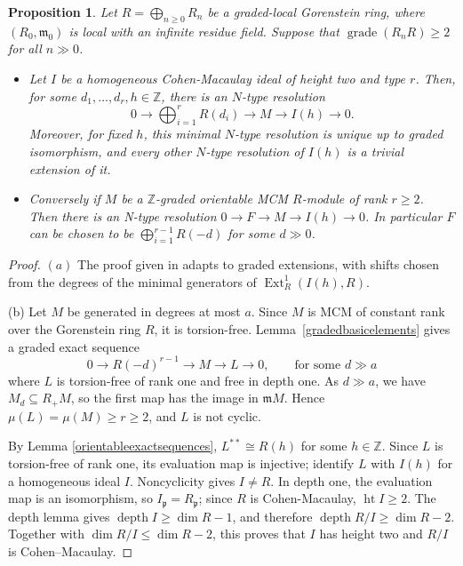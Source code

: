 \documentclass[11pt,letterpaper]{amsart}
\newcommand{\x}{\xrightarrow{}}
\DeclareMathOperator{\Ext}{Ext}
\DeclareMathOperator{\gr}{grade}
\theoremstyle{plain}
\newtheorem{prop}[thm]{Proposition}
\theoremstyle{definition}
\theoremstyle{remark}
\begin{document}
\begin{prop}\cite[Proposition~1.8, Proposition~1.9]{herzog1987maximal}\label{existenceNtype} Let $R=\bigoplus_{n\ge0}R_n$ be a graded-local Gorenstein ring,
where $(R_0,\mathfrak m_0)$ is local with an infinite residue field.
Suppose that $\gr(R_nR)\ge2$ for all $n\gg 0$.

\begin{itemize}
    \item[$\rm{(a)}$] Let $I$ be a homogeneous Cohen-Macaulay ideal
of height two and type $r$. Then, for some
$d_1,\ldots,d_r,h\in\mathbb Z$, there is an $N$-type
resolution
\[
0\longrightarrow \bigoplus_{i=1}^r R(d_i)
\longrightarrow M\longrightarrow I(h)\longrightarrow0.
\]
Moreover, for fixed $h$, this minimal $N$-type resolution is unique
up to graded isomorphism, and every other $N$-type
resolution of $I(h)$ is a trivial extension of it.

    \item[$\rm{(b)}$] Conversely if $M$ be a $\mathbb Z$-graded orientable MCM $R$-module of rank $r\ge 2$. Then there is an N-type resolution $0\x F\x M\x I(h)\x0$. In particular $F$ can be chosen to be $\bigoplus_{i=1}^{r-1} R(-d)$ for some $d\gg0$. 
\end{itemize}
\end{prop}
\begin{proof}
$(a)$ The proof given in \cite[Proposition~1.9]{herzog1987maximal} adapts to graded extensions, with shifts chosen
from the degrees of the minimal generators of $\Ext_R^1(I(h),R)$. 

(b) Let $M$ be generated in degrees at most $a$. Since $M$ is MCM of constant rank over the Gorenstein ring $R$, it is torsion-free. Lemma~\ref{gradedbasicelements} gives a graded exact sequence
\[
0\longrightarrow R(-d)^{r-1}\longrightarrow M\longrightarrow L\longrightarrow0, \qquad\text{for some }d\gg a
\]
where $L$ is torsion-free of rank one and free in depth one. As $d\gg a$, we have $M_d\subseteq R_+M$, so the first map has the image in $\mathfrak mM$. Hence $\mu(L)=\mu(M)\geq r\geq2$, and $L$ is not cyclic.

By Lemma \ref{orientableexactsequences}, $L^{**}\cong R(h)$ for some $h\in\mathbb Z$. Since $L$ is torsion-free of rank one, its evaluation map is injective; identify $L$ with $I(h)$ for a homogeneous ideal $I$. Noncyclicity gives $I\ne R$. In depth one, the evaluation map is an isomorphism, so $I_{\mathfrak p}=R_{\mathfrak p}$; since $R$ is Cohen-Macaulay, $\operatorname{ht}I\geq2$. The depth lemma gives $\operatorname{depth}I\geq\dim R-1$, and therefore $\operatorname{depth}R/I\geq\dim R-2$. Together with $\dim R/I\leq\dim R-2$, this proves that $I$ has height two and $R/I$ is Cohen--Macaulay.
\end{proof}
\end{document}
